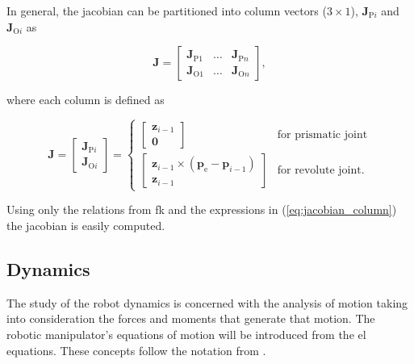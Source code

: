In general, the jacobian can be partitioned into column vectors ($3\times1$), $\boldsymbol{J}_{\text{P}i}$ and $\boldsymbol{J}_{\text{O}i}$ as

\begin{equation}
    \boldsymbol{J} = \begin{bmatrix}
    \boldsymbol{J}_{\text{P}1} & \ldots & \boldsymbol{J}_{\text{P}n} \\
    \boldsymbol{J}_{\text{O}1} & \ldots & \boldsymbol{J}_{\text{O}n}
    \end{bmatrix},
\end{equation}

where each column is defined as

\begin{equation}
    \label{eq:jacobian_column}
    \boldsymbol{J} = \begin{bmatrix}
    \boldsymbol{J}_{\text{P}i}\\
    \boldsymbol{J}_{\text{O}i}
    \end{bmatrix} = \left\{ \begin{array}{cc}
        \begin{bmatrix}
            \boldsymbol{z}_{i-1}\\
            \boldsymbol{0}
        \end{bmatrix} & \text{for prismatic joint} \\
        \begin{bmatrix}
        \boldsymbol{z}_{i-1} \times (\boldsymbol{p}_\text{e} - \boldsymbol{p}_{i-1})\\
        \boldsymbol{z}_{i-1}
        \end{bmatrix} & \text{for revolute joint}.
    \end{array}\right.
\end{equation}

Using only the relations from \gls{fk} and the expressions in (\ref{eq:jacobian_column}) the jacobian is easily computed.



\subsection{Dynamics}
\label{subsec:dynamics}

The study of the robot dynamics is concerned with the analysis of motion taking into consideration the forces and moments that generate that motion. The robotic manipulator's equations of motion will be introduced from the \gls{el} equations. These concepts follow the notation from \cite{Spong2005_robot_dynamics_control}.

